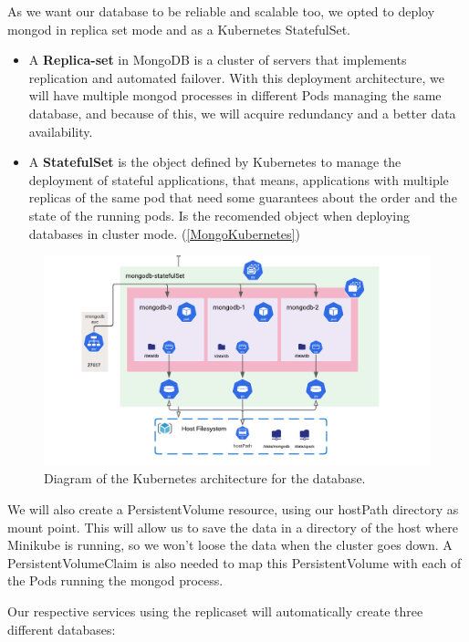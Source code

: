 As we want our database to be reliable and scalable too, we opted to deploy mongod in replica set mode and as a Kubernetes StatefulSet.

\begin{itemize}
  \item A \textbf{Replica-set} in MongoDB is a cluster of servers that implements replication and automated failover. With this deployment architecture, we will have multiple mongod processes in different Pods managing the same database, and because of this, we will acquire redundancy and a better data availability.
  \item A \textbf{StatefulSet} is the object defined by Kubernetes to manage the deployment of stateful applications, that means, applications with multiple replicas of the same pod that need some guarantees about the order and the state of the running pods. Is the recomended object when deploying databases in cluster mode. (\ref{MongoKubernetes})
\end{itemize}

\begin{figure}[H]
	\centering
	\includegraphics[width=1\linewidth]{imagenes/diagram-db.png}
	\caption{Diagram of the Kubernetes architecture for the database.}
	\label{diagram-db}
\end{figure}

We will also create a PersistentVolume resource, using our hostPath directory as mount point. This will allow us to save the data in a directory of the host where Minikube is running, so we won't loose the data when the cluster goes down. A PersistentVolumeClaim is also needed to map this PersistentVolume with each of the Pods running the mongod process.

Our respective services using the replicaset will automatically create three different databases:

